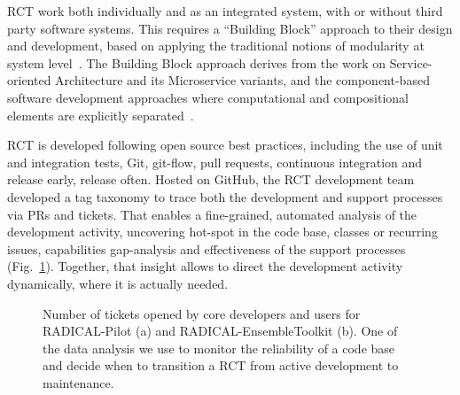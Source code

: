 \documentclass[preprint,12pt, a4paper]{elsarticle}
\begin{document}
RCT work both individually and as an integrated system, with or without third
party software systems. This requires a ``Building Block'' approach to their
design and development, based on applying the traditional notions of modularity
at system level~\cite{turilli2019middleware}. The Building Block approach
derives from the work on Service-oriented Architecture and its Microservice
variants, and the component-based software development approaches where
computational and compositional elements are explicitly
separated~\cite{garlan1995architectural,clemens1998component,schneider2000components}.

RCT is developed following open source best practices, including the use of unit
and integration tests, Git, git-flow, pull requests, continuous integration and
release early, release often. Hosted on GitHub, the RCT development team
developed a tag taxonomy to trace both the development and support processes via
PRs and tickets. That enables a fine-grained, automated analysis of the
development activity, uncovering hot-spot in the code base, classes or recurring
issues, capabilities gap-analysis and effectiveness of the support processes
(Fig.~\ref{fig:tags}). Together, that insight allows to direct the development
activity dynamically, where it is actually needed.

\begin{figure}
        \centering
        \qquad
        \caption{Number of tickets opened by core developers and users for
        RADICAL-Pilot (a) and RADICAL-EnsembleToolkit (b). One of the data
        analysis we use to monitor the reliability of a code base and decide
        when to transition a RCT from active development to
        maintenance.}\label{fig:tags}
\end{figure}
\end{document}
